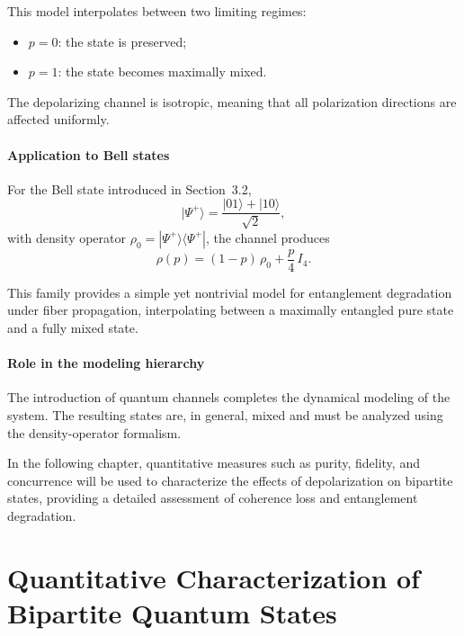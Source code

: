 \documentclass[a4paper]{article}
\begin{document}
\medskip

This model interpolates between two limiting regimes:
\begin{itemize}
\item \( p = 0 \): the state is preserved;
\item \( p = 1 \): the state becomes maximally mixed.
\end{itemize}

The depolarizing channel is isotropic, meaning that all polarization directions are affected uniformly.

\medskip

\paragraph{Application to Bell states}

For the Bell state introduced in Section~3.2,
\[
|\Psi^+\rangle = \frac{|01\rangle + |10\rangle}{\sqrt{2}},
\]
with density operator \( \rho_0 = |\Psi^+\rangle\langle\Psi^+| \), the channel produces
\[
\rho(p)
=
(1 - p)\,\rho_0
+
\frac{p}{4}\, I_4.
\]

This family provides a simple yet nontrivial model for entanglement degradation under fiber propagation, interpolating between a maximally entangled pure state and a fully mixed state.

\medskip

\paragraph{Role in the modeling hierarchy}

The introduction of quantum channels completes the dynamical modeling of the system. The resulting states are, in general, mixed and must be analyzed using the density-operator formalism.

In the following chapter, quantitative measures such as purity, fidelity, and concurrence will be used to characterize the effects of depolarization on bipartite states, providing a detailed assessment of coherence loss and entanglement degradation.



\section{Quantitative Characterization of Bipartite Quantum States}
\end{document}

